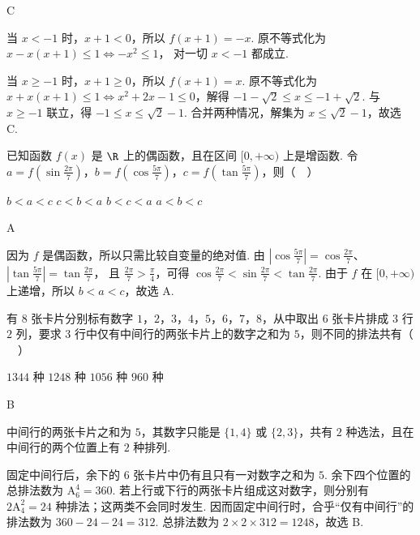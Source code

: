 \begin{answer}
C
\end{answer}

\begin{solution}
当 \(x<-1\) 时，\(x+1<0\)，所以 \(f(x+1)=-x\). 原不等式化为
\(x-x(x+1)\leqslant1\iff -x^2\leqslant1\)，
对一切 \(x<-1\) 都成立.

当 \(x\geqslant-1\) 时，\(x+1\geqslant0\)，所以 \(f(x+1)=x\). 原不等式化为
\(x+x(x+1)\leqslant1\iff x^2+2x-1\leqslant0\)，解得 \(-1-\sqrt{2}\leqslant x\leqslant-1+\sqrt{2}\). 与 \(x\geqslant-1\) 联立，得 \(-1\leqslant x\leqslant\sqrt{2}-1\). 合并两种情况，解集为 \(x\leqslant\sqrt{2}-1\)，故选 C.
\end{solution}

\begin{problem}
已知函数 \( f(x) \) 是 \(\R\) 上的偶函数，且在区间 \([0, +\infty)\) 上是增函数. 令 \(a = f\left(\sin \frac{2\pi}{7}\right)\)，\(b = f\left(\cos \frac{5\pi}{7}\right)\)，\(c = f\left(\tan \frac{5\pi}{7}\right)\)，则（\(\quad\)）

\choices
    {\(b < a < c\)}
    {\(c < b < a\)}
    {\(b < c < a\)}
    {\(a < b < c\)}
\end{problem}

\begin{answer}
A
\end{answer}

\begin{solution}
因为 \(f\) 是偶函数，所以只需比较自变量的绝对值. 由 \(\left\lvert\cos\frac{5\pi}{7}\right\rvert=\cos\frac{2\pi}{7}\)、\(\left\lvert\tan\frac{5\pi}{7}\right\rvert=\tan\frac{2\pi}{7}\)，
且 \(\frac{2\pi}{7}>\frac\pi4\)，可得
\(\cos\frac{2\pi}{7}<\sin\frac{2\pi}{7}<\tan\frac{2\pi}{7}\).
由于 \(f\) 在 \([0,+\infty)\) 上递增，所以 \(b<a<c\)，故选 A.
\end{solution}

\begin{problem}
有 \(8\) 张卡片分别标有数字 \(1\)，\(2\)，\(3\)，\(4\)，\(5\)，\(6\)，\(7\)，\(8\)，从中取出 \(6\) 张卡片排成 \(3\) 行 \(2\) 列，要求 \(3\) 行中仅有中间行的两张卡片上的数字之和为 \(5\)，则不同的排法共有（\(\quad\)）

\choices
    {\(1344\) 种}
    {\(1248\) 种}
    {\(1056\) 种}
    {\(960\) 种}
\end{problem}

\begin{answer}
B
\end{answer}

\begin{solution}
中间行的两张卡片之和为 \(5\)，其数字只能是 \(\{1,4\}\) 或 \(\{2,3\}\)，共有 \(2\) 种选法，且在中间行的两个位置上有 \(2\) 种排列.

固定中间行后，余下的 \(6\) 张卡片中仍有且只有一对数字之和为 \(5\). 余下四个位置的总排法数为 \(\mathrm A_6^4=360\). 若上行或下行的两张卡片组成这对数字，则分别有 \(2\mathrm A_4^2=24\) 种排法；这两类不会同时发生. 因而固定中间行时，合乎“仅有中间行”的排法数为
\(360-24-24=312\). 总排法数为 \(2\times2\times312=1248\)，故选 B.
\end{solution}

